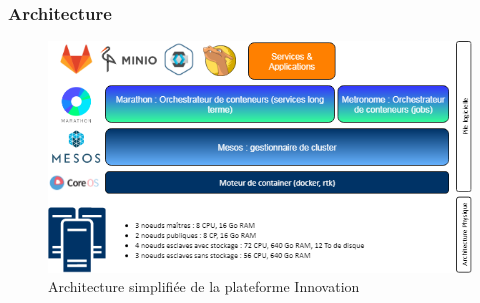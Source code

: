 \subsubsection*{Architecture}
\vspace{10pt}
\begin{figure}[H]
  \centering
  \includegraphics[scale=0.70]{images/Archi-inno.png}
  \caption{Architecture simplifiée de la plateforme Innovation}
  \label{fig:une-image}
\end{figure}
\vspace{10pt}

